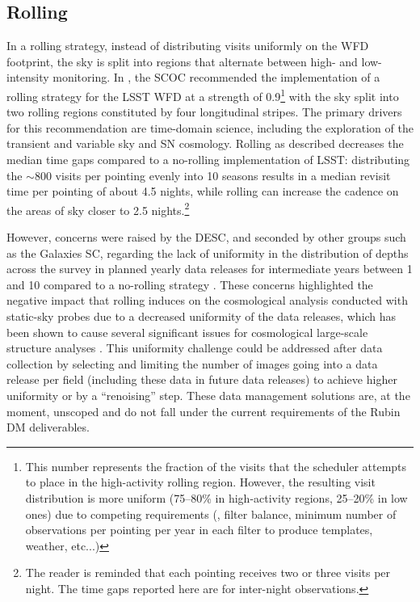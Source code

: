 \subsection{Rolling}\label{sec:rolling}
In a rolling strategy, instead of distributing visits uniformly on the WFD footprint, the sky is split into regions that alternate between high- and low-intensity monitoring. In , the SCOC recommended the implementation of a rolling strategy for the LSST WFD at a strength of 0.9\footnote{This number represents the fraction of the visits that the scheduler attempts to place in the high-activity rolling region. However, the resulting visit distribution is more uniform (75--80\% in high-activity regions, 25--20\% in low ones) due to competing requirements (\eg , filter balance, minimum number of observations per pointing per year in each filter to produce templates, weather, etc...)} 
with the sky split into two rolling regions constituted by four longitudinal stripes. The primary drivers for this recommendation are time-domain science, including the exploration of the transient and variable sky and SN cosmology. Rolling as described decreases the median time gaps compared to a no-rolling implementation of LSST:
distributing the \mbox{$\sim$800} visits per pointing evenly into 10 seasons results in a median revisit time per pointing of about 4.5 nights, while rolling can increase the cadence on the areas of sky closer to 2.5 nights.\footnote{The reader is reminded that each pointing receives two or three visits per night. The time gaps reported here are for inter-night observations.}

 However, concerns were raised by the DESC, and seconded by other groups such as the Galaxies SC, regarding the lack of uniformity in the distribution of depths across the survey in planned yearly data releases for intermediate years between 1 and 10 compared to a no-rolling strategy \citep[see discussion in][which noted this as a potential future concern before the adoption of a rolling cadence as the baseline]{2022ApJS..259...58L}.  These concerns highlighted the negative impact that rolling induces on the cosmological analysis conducted with static-sky probes due to a decreased uniformity of the data releases, which has been shown to cause several significant issues for cosmological large-scale structure analyses \citep[\eg ,][]{2022PhRvD.105b3520A,2023JCAP...07..044B}.  
 This uniformity challenge could be addressed after data collection by selecting and limiting the number of images going into a data release per field (including these data in future data releases) to achieve higher uniformity or by a ``renoising'' step. These data management solutions are, at the moment, unscoped and do not fall under the current requirements of the Rubin DM deliverables.

